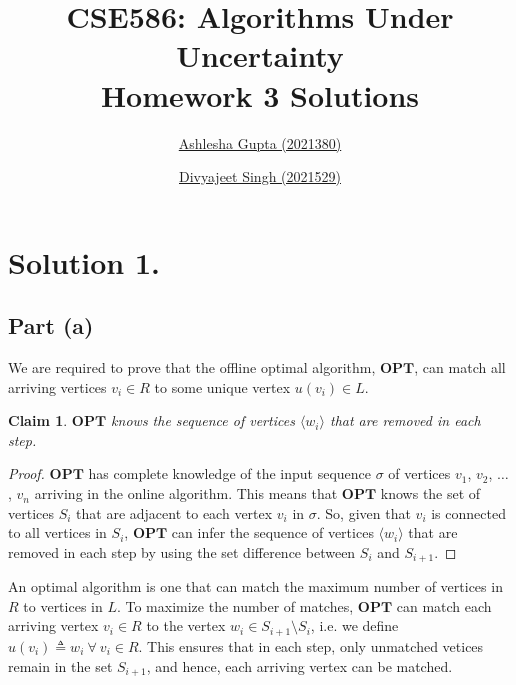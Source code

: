 \documentclass[11pt]{article}
\title{
    \textbf{CSE586: Algorithms Under Uncertainty} \\
    Homework 3 Solutions %
}
\author{
    \href{mailto:ashlesha21380@iiitd.ac.in}{Ashlesha Gupta (2021380)} \and
    \href{mailto:divyajeet21529@iiitd.ac.in}{Divyajeet Singh (2021529)}
}
\date{}
\newtheorem{claim}{Claim}
\begin{document}
\maketitle

\section*{Solution 1.}

\subsection*{Part (a)}
We are required to prove that the offline optimal algorithm, $\mathbf{OPT}$,
can match all arriving vertices $v_{i} \in R$ to some unique vertex $u(v_{i}) \in L$.
\begin{claim}
    $\mathbf{OPT}$ knows the sequence of vertices $\langle w_{i} \rangle$ that
    are removed in each step.
\end{claim}
\begin{proof}
    $\mathbf{OPT}$ has complete knowledge of the input sequence $\sigma$
    of vertices $v_{1}$, $v_{2}$, $\ldots$, $v_{n}$ arriving in the online
    algorithm. This means that $\mathbf{OPT}$ knows the set of vertices $S_{i}$
    that  are adjacent to each vertex $v_{i}$ in $\sigma$. So, given that
    $v_{i}$ is connected to all vertices in $S_{i}$, $\mathbf{OPT}$ can infer
    the sequence of vertices $\langle w_{i} \rangle$ that are removed in each
    step by using the set difference between $S_{i}$ and $S_{i+1}$.
\end{proof}
An optimal algorithm is one that can match the maximum number of vertices
in $R$ to vertices in $L$. To maximize the number of matches, $\mathbf{OPT}$
can match each arriving vertex $v_{i} \in R$ to the vertex $w_{i} \in S_{i+1} \setminus S_{i}$,
i.e. we define $u(v_{i}) \triangleq w_{i} \ \forall \ v_{i} \in R$. This ensures that in each step, only unmatched vetices remain in the set $S_{i+1}$,
and hence, each arriving vertex can be matched.
\end{document}
